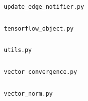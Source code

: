 \documentclass{subfiles}
\begin{document}
      \begin{figure}
        \centering
        \inputminted[linenos]{python}{../src/tf_G/utils/update_edge_notifier.py}
        \caption{\texttt{update\_edge\_notifier.py}}
        \label{code:update_edge_notifier}
      \end{figure}

      \begin{figure}
        \centering
        \inputminted[linenos]{python}{../src/tf_G/utils/tensorflow_object.py}
        \caption{\texttt{tensorflow\_object.py}}
        \label{code:tensorflow_object}
      \end{figure}

      \begin{figure}
        \centering
        \inputminted[linenos]{python}{../src/tf_G/utils/utils.py}
        \caption{\texttt{utils.py}}
        \label{code:utils}
      \end{figure}

      \begin{figure}
        \centering
        \inputminted[linenos]{python}{../src/tf_G/utils/vector_convergence.py}
        \caption{\texttt{vector\_convergence.py}}
        \label{code:utils}
      \end{figure}

      \begin{figure}
        \centering
        \inputminted[linenos]{python}{../src/tf_G/utils/vector_norm.py}
        \caption{\texttt{vector\_norm.py}}
        \label{code:vector_norm}
      \end{figure}
\end{document}
